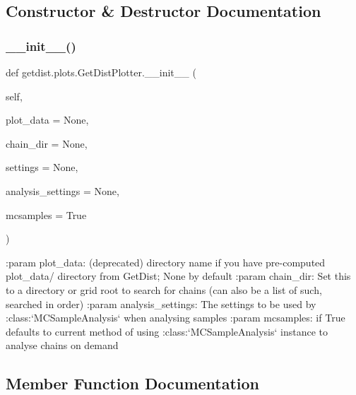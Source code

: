 \subsection{Constructor \& Destructor Documentation}
\mbox{\label{classgetdist_1_1plots_1_1GetDistPlotter_a1d102ce35be5934c0f9e3d170939f1f9}} 
\subsubsection{\texorpdfstring{\+\_\+\+\_\+init\+\_\+\+\_\+()}{\_\_init\_\_()}}
{\footnotesize\ttfamily def getdist.\+plots.\+Get\+Dist\+Plotter.\+\_\+\+\_\+init\+\_\+\+\_\+ (\begin{DoxyParamCaption}\item[{}]{self,  }\item[{}]{plot\+\_\+data = {\ttfamily None},  }\item[{}]{chain\+\_\+dir = {\ttfamily None},  }\item[{}]{settings = {\ttfamily None},  }\item[{}]{analysis\+\_\+settings = {\ttfamily None},  }\item[{}]{mcsamples = {\ttfamily True} }\end{DoxyParamCaption})}

\begin{DoxyVerb}:param plot_data: (deprecated) directory name if you have pre-computed plot_data/ directory from GetDist; None by default
:param chain_dir: Set this to a directory or grid root to search for chains (can also be a list of such, searched in order)
:param analysis_settings: The settings to be used by :class:`MCSampleAnalysis` when analysing samples
:param mcsamples: if True defaults to current method of using :class:`MCSampleAnalysis` instance to analyse chains on demand
\end{DoxyVerb}
 

\subsection{Member Function Documentation}
\mbox{\label{classgetdist_1_1plots_1_1GetDistPlotter_a0baa9ed916992d8216ca3cc0ddf4eb4a}} 
